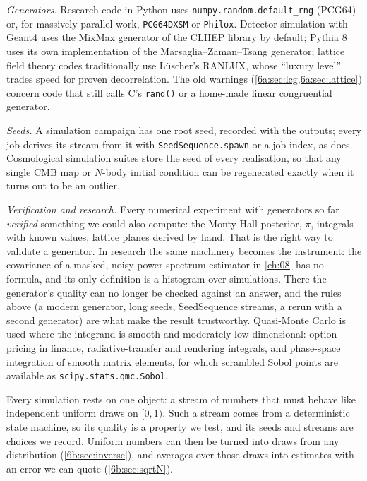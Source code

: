 \begin{inpractice}
\emph{Generators.} Research code in Python uses \texttt{numpy.random.default\_rng}
(PCG64) or, for massively parallel work, \texttt{PCG64DXSM} or \texttt{Philox}.
Detector simulation with Geant4 uses the MixMax generator of the CLHEP library by
default; Pythia 8 uses its own implementation of the Marsaglia--Zaman--Tsang
generator; lattice field theory codes traditionally use L\"uscher's RANLUX, whose
``luxury level'' trades speed for proven decorrelation. The old warnings
(\cref{6a:sec:lcg,6a:sec:lattice}) concern code that still calls C's \texttt{rand()}
or a home-made linear congruential generator.

\emph{Seeds.} A simulation campaign has one root seed, recorded with the outputs;
every job derives its stream from it with \texttt{SeedSequence.spawn} or a job
index, as  does. Cosmological simulation suites store the seed of
every realisation, so that any single CMB map or $N$-body initial condition can be
regenerated exactly when it turns out to be an outlier.

\emph{Verification and research.} Every numerical experiment with generators so far
\emph{verified} something we could also compute: the Monty Hall posterior, $\pi$,
integrals with known values, lattice planes derived by hand. That is the right
way to validate a generator. In research the same machinery becomes the instrument:
the covariance of a masked, noisy power-spectrum estimator in \cref{ch:08} has no
formula, and its only definition is a histogram over simulations. There the
generator's quality can no longer be checked against an answer, and the rules
above (a modern generator, long seeds, SeedSequence streams, a rerun with a
second generator) are what make the result trustworthy. Quasi-Monte Carlo is used
where the integrand is smooth and moderately low-dimensional: option pricing in
finance, radiative-transfer and rendering integrals, and phase-space integration
of smooth matrix elements, for which scrambled Sobol points are available as
\texttt{scipy.stats.qmc.Sobol}.
\end{inpractice}

Every simulation rests on one object: a stream of numbers that must behave like
independent uniform draws on $[0,1)$. Such a stream comes from a deterministic
state machine, so its quality is a property we test, and its seeds and streams are
choices we record. Uniform numbers can then be turned into draws from any
distribution (\cref{6b:sec:inverse}), and averages over those draws into estimates
with an error we can quote (\cref{6b:sec:sqrtN}).

